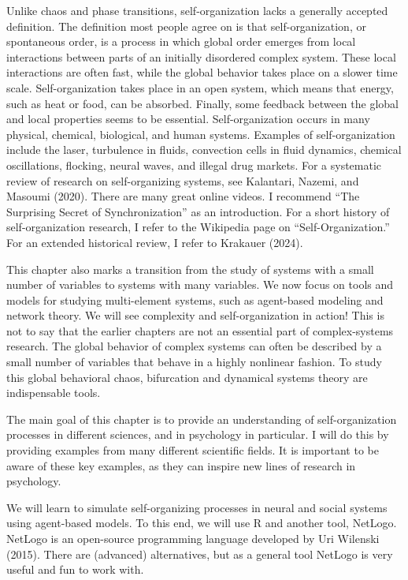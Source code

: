 \documentclass[
  a4paper,
  DIV=11,
  numbers=noendperiod,
  oneside]{scrreprt}
\begin{document}
Unlike chaos and phase transitions, self-organization lacks a generally
accepted definition. The definition most people agree on is that
self-organization, or spontaneous order, is a process in which global
order emerges from local interactions between parts of an initially
disordered complex system. These local interactions are often fast,
while the global behavior takes place on a slower time scale.
Self-organization takes place in an open system, which means that
energy, such as heat or food, can be absorbed. Finally, some feedback
between the global and local properties seems to be essential.
Self-organization occurs in many physical, chemical, biological, and
human systems. Examples of self-organization include the laser,
turbulence in fluids, convection cells in fluid dynamics, chemical
oscillations, flocking, neural waves, and illegal drug markets. For a
systematic review of research on self-organizing systems, see Kalantari,
Nazemi, and Masoumi (2020). There are many great online videos. I
recommend ``The Surprising Secret of Synchronization'' as an
introduction. For a short history of self-organization research, I refer
to the Wikipedia page on ``Self-Organization.'' For an extended
historical review, I refer to Krakauer (2024).

This chapter also marks a transition from the study of systems with a
small number of variables to systems with many variables. We now focus
on tools and models for studying multi-element systems, such as
agent-based modeling and network theory. We will see complexity and
self-organization in action! This is not to say that the earlier
chapters are not an essential part of complex-systems research. The
global behavior of complex systems can often be described by a small
number of variables that behave in a highly nonlinear fashion. To study
this global behavioral chaos, bifurcation and dynamical systems theory
are indispensable tools.

The main goal of this chapter is to provide an understanding of
self-organization processes in different sciences, and in psychology in
particular. I will do this by providing examples from many different
scientific fields. It is important to be aware of these key examples, as
they can inspire new lines of research in psychology.

We will learn to simulate self-organizing processes in neural and social
systems using agent-based models. To this end, we will use R and another
tool, NetLogo. NetLogo is an open-source programming language developed
by Uri Wilenski (2015). There are (advanced) alternatives, but as a
general tool NetLogo is very useful and fun to work with.
\end{document}
